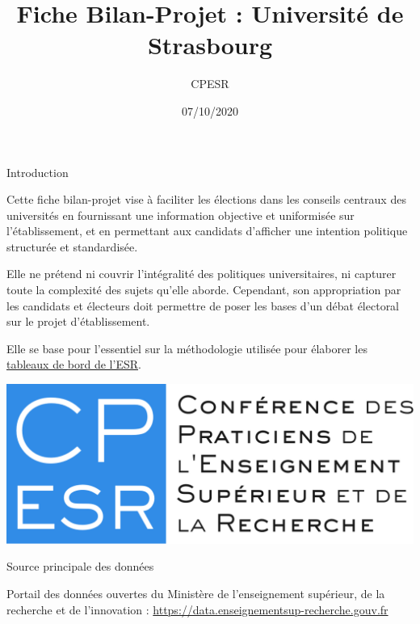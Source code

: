\documentclass[
  8pt,
  french,
  ignorenonframetext,
  landscape]{beamer}
\title{Fiche Bilan-Projet : Université de Strasbourg}
\author{CPESR}
\date{07/10/2020}
\begin{document}
\frame{\titlepage}

\begin{frame}{Introduction}
\protect\hypertarget{introduction}{}

Cette fiche bilan-projet vise à faciliter les élections dans les
conseils centraux des universités en fournissant une information
objective et uniformisée sur l'établissement, et en permettant aux
candidats d'afficher une intention politique structurée et standardisée.

Elle ne prétend ni couvrir l'intégralité des politiques universitaires,
ni capturer toute la complexité des sujets qu'elle aborde. Cependant,
son appropriation par les candidats et électeurs doit permettre de poser
les bases d'un débat électoral sur le projet d'établissement.

Elle se base pour l'essentiel sur la méthodologie utilisée pour élaborer
les \href{https://cpesr.fr/2020/09/tableau-de-bord-esr/}{tableaux de
bord de l'ESR}.

\begin{center}\includegraphics[height=0.2\textheight]{files/logo_cpesr_sackersgothic} \end{center}

\begin{block}{Source principale des données}

Portail des données ouvertes du Ministère de l'enseignement supérieur,
de la recherche et de l'innovation :
\url{https://data.enseignementsup-recherche.gouv.fr}

\end{block}

\end{frame}
\end{document}
